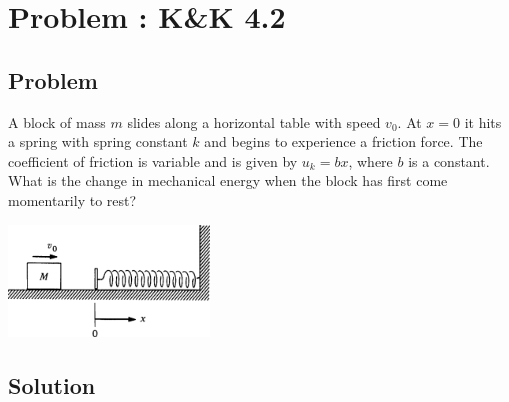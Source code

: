 \documentclass[solutions]{esg8012pset}
\date{October 15}
\begin{document}
\section{Problem \thesection: K\&K 4.2}
\subsection{Problem}
  A block of mass $m$ slides along a horizontal table with speed $v_0$. At $x = 0$ it hits a spring with spring constant $k$ and begins to experience a friction force. The coefficient of friction is variable and is given by $u_k = bx$, where $b$ is a constant. What is the change in mechanical energy when the block has first come momentarily to rest?
  \begin{center}\includegraphics[width=0.4\textwidth]{ps06_1}\end{center}
\subsection{Solution}
\end{document}
